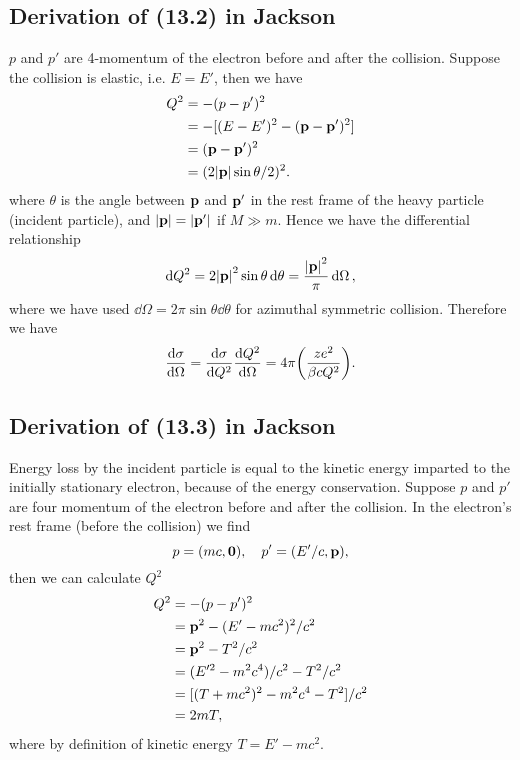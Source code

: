 \documentclass[10pt]{article}
\begin{document}
\subsection{Derivation of (13.2) in Jackson}
$p$ and $p'$ are 4-momentum of the electron before and after the collision. Suppose the collision is elastic, i.e. $E = E'$, then we have
\begin{align*}
	Q^2 &= - (p - p')^2 \\
	&= -[(E - E')^2 - (\vb{p} - \vb{p'})^2] \\
	&= (\vb{p} - \vb{p'})^2 \\
	&= (2 \abs{\vb{p}} \sin{\theta/2})^2.
\end{align*}
where $\theta$ is the angle between $\vb{p}$ and $\vb{p'}$ in the rest frame of the heavy particle (incident particle), and $\abs{\vb{p}} = \abs{\vb{p'}}$ if $M \gg m$. Hence we have the differential relationship
\begin{equation}
	\dd{Q^2} = 2 \abs{\vb{p}}^2 \sin{\theta} \dd{\theta} = \frac{\abs{\vb{p}}^2}{\pi} \dd{\Omega},
\end{equation}
where we have used $\dd{\Omega} = 2\pi \sin{\theta} \dd{\theta}$ for azimuthal symmetric collision. Therefore we have
\begin{align*}
	\dv{\sigma}{\Omega} = \dv{\sigma}{Q^2} \dv{Q^2}{\Omega} = 4 \pi \qty(\frac{ze^2}{\beta c Q^2}).
\end{align*}

\subsection{Derivation of (13.3) in Jackson}
Energy loss by the incident particle is equal to the kinetic energy imparted to the initially stationary electron, because of the energy conservation. Suppose $p$ and $p'$ are four momentum of the electron before and after the collision. In the electron's rest frame (before the collision) we find
\begin{equation}
	p = (mc, \vb{0})\qc p' = (E'/c, \vb{p}),
\end{equation}
then we can calculate $Q^2$
\begin{align*}
	Q^2 &= -(p-p')^2\\
	&= \vb{p}^2 - (E'- mc^2)^2/c^2 \\
	&= \vb{p}^2 - T^2/c^2 \\
	&= (E'^2 - m^2c^4)/c^2 - T^2/c^2 \\
	&= [(T+mc^2)^2 - m^2c^4 - T^2]/c^2 \\
	&= 2mT,
\end{align*}
where by definition of kinetic energy $T = E' - mc^2$.
\end{document}
